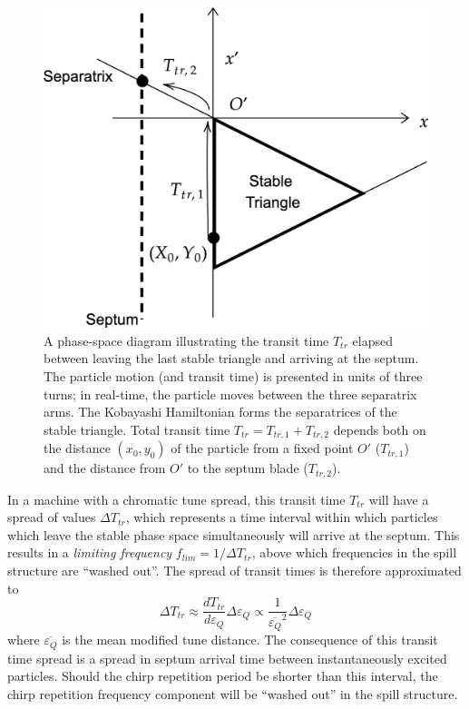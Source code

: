 \documentclass[11pt]{report}
\begin{document}
\begin{figure}
  \centering
  \includegraphics*[width=0.6\linewidth]{transit-time-phase-space.png}
  \caption{A phase-space diagram illustrating the transit time $T_{tr}$ elapsed between leaving the last stable triangle and arriving at the septum. The particle motion (and transit time) is presented in units of three turns; in real-time, the particle moves between the three separatrix arms. The Kobayashi Hamiltonian forms the separatrices of the stable triangle. Total transit time $T_{tr}=T_{tr,1} + T_{tr,2}$ depends both on the distance $(x_0, y_0)$ of the particle from a fixed point $O'$ ($T_{tr,1}$) and the distance from $O'$ to the septum blade ($T_{tr,2}$).}\label{fig:transit_time}
\end{figure}

In a machine with a chromatic tune spread, this transit time $T_{tr}$ will have a spread of values $\Delta T_{tr}$, which represents a time interval within which particles which leave the stable phase space simultaneously will arrive at the septum. This results in a \textit{limiting frequency} $f_{lim}=1/\Delta T_{tr}$, above which frequencies in the spill structure are ``washed out''. 
The spread of transit times is therefore approximated to~\cite{PhysRevApplied.13.044076, Pullia:313678}
\begin{equation}
  \Delta T_{tr}\approx\frac{dT_{tr}}{d{\varepsilon_Q}}\Delta{\varepsilon_Q}\propto\frac 1{\overline{\varepsilon_Q}^2}\Delta\varepsilon_Q
\end{equation} where $\overline{\varepsilon_Q}$ is the mean modified tune distance. 
The consequence of this transit time spread is a spread in septum arrival time between instantaneously excited particles. Should the chirp repetition period be shorter than this interval, the chirp repetition frequency component will be ``washed out'' in the spill structure.
\end{document}
